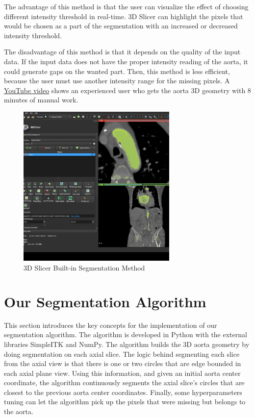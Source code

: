 The advantage of this method is that the user can visualize the effect of choosing different intensity threshold in real-time. 3D Slicer can highlight the pixels that would be chosen as a part of the segmentation with an increased or decreased intensity threshold.

The disadvantage of this method is that it depends on the quality of the input data. If the input data does not have the proper intensity reading of the aorta, it could generate gaps on the wanted part. Then, this method is less efficient, because the user must use another intensity range for the missing pixels. A \href{https://www.youtube.com/watch?v=5_673cHMBiY}{YouTube video} shows an experienced user who gets the aorta 3D geometry with 8 minutes of manual work. 

\begin{figure}[H]
    \centering
    \includegraphics[width=0.7\textwidth]{figures/Sample/3D-Slicer-Segmentation.png}
    \caption[3D Slicer Built-in Segmentation UI]{3D Slicer Built-in Segmentation Method \cite{Kikinis2014}}
    \label{fig_3D_Seg_Builtin}
\end{figure}

\section{Our Segmentation Algorithm}

This section introduces the key concepts for the implementation of our segmentation algorithm. The algorithm is developed in Python with the external libraries SimpleITK and NumPy. The algorithm builds the 3D aorta geometry by doing segmentation on each axial slice. The logic behind segmenting each slice from the axial view is that there is one or two circles that are edge bounded in each axial plane view. Using this information, and given an initial aorta center coordinate, the algorithm continuously segments the axial slice's circles that are closest to the previous aorta center coordinates. Finally, some hyperparameters tuning can let the algorithm pick up the pixels that were missing but belongs to the aorta.

